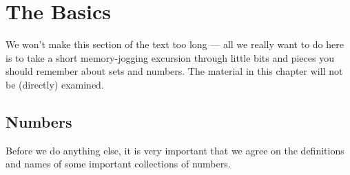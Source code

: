 %
%
\graphicspath{{./figures/basic/}}

\chapter{The Basics}
\label{chap basics}
We won't make this section of the text too long --- all we really want to do
here is to take a short memory-jogging excursion through little bits and
pieces you should remember about sets and numbers. The material in this chapter will not
be (directly) examined.


\section{Numbers}\label{sec_0_1}
Before we do anything else, it is very important that we agree on the definitions
and names of some important collections of numbers.

